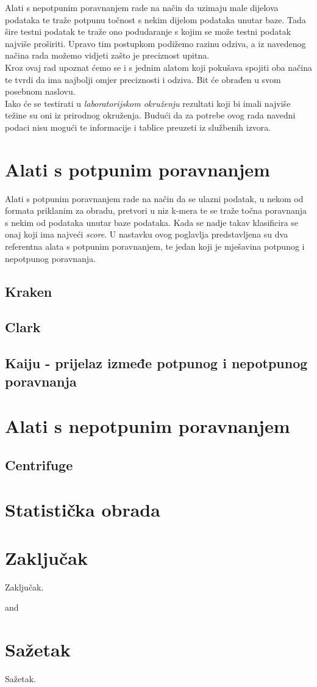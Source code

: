 \documentclass[times, utf8, seminar]{fer}
\begin{document}
Alati s nepotpunim poravnanjem rade na način da uzimaju male dijelova podataka te traže potpunu točnost s nekim dijelom podataka unutar baze. Tada šire testni podatak te traže ono podudaranje s kojim se može testni podatak najviše proširiti. Upravo tim postupkom podižemo razinu odziva, a iz navedenog načina rada možemo vidjeti zašto je preciznost upitna.
\\Kroz ovaj rad upoznat ćemo se i s jednim alatom koji pokušava spojiti oba načina te tvrdi da ima najbolji omjer preciznosti i odziva. Bit će obrađen u svom posebnom naslovu.
\\Iako će se testirati u \textit{laboratorijskom okruženju} rezultati koji bi imali najviše težine su oni iz prirodnog okruženja. Budući da za potrebe ovog rada navedni podaci nisu mogući te informacije i tablice preuzeti iz službenih izvora.
\chapter{Alati s potpunim poravnanjem}
Alati s potpunim poravnanjem rade na način da se ulazni podatak, u nekom od formata priklanim za obradu, pretvori u niz k-mera te se traže točna poravnanja s nekim od podataka unutar baze podataka. Kada se nadje takav klasificira se onaj koji ima najveći \textit{score}. U nastavku ovog poglavlja predstavljena su dva referentna alata s potpunim poravnanjem, te jedan koji je mješavina potpunog i nepotpunog poravnanja.
\section{Kraken}
\section{Clark}
\section{Kaiju - prijelaz izmeđe potpunog i nepotpunog poravnanja}
\chapter{Alati s nepotpunim poravnanjem}
\section{Centrifuge}
\chapter{Statistička obrada}
\chapter{Zaključak}
Zaključak.



\cite{CLARK}
\cite{CLARK-S}
\cite{Centrifuge}
\cite{Kaiju}
\cite{Kraken}
\cite{Report}and
\chapter{Sažetak}
Sažetak.
\end{document}

